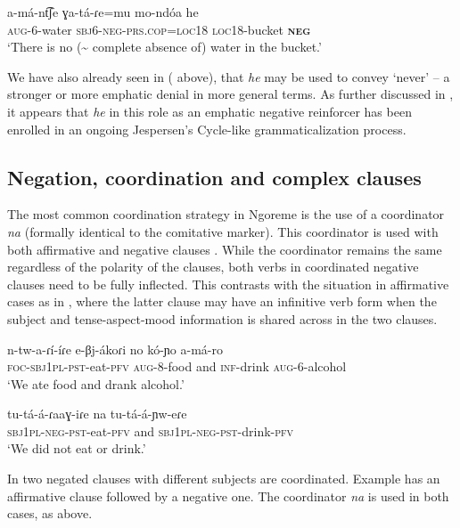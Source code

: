 \documentclass[output=paper,colorlinks,citecolor=brown,draftmode]{langscibook}
\begin{document}
\ea\label{ex:ngo:81} 
    \gll a{}-má{}-nt͡ʃe ɣa-tá{}-ɾe=mu mo-ndóa he\\ 
        \textsc{aug-}6-water \textsc{sbj6-neg-}\textsc{prs.cop=loc18} \textsc{loc18}{}-bucket \textbf{\textsc{neg}}\\
    \glt‘There is no ({\textasciitilde} complete absence of) water in the bucket.’ 
\z 

We have also already seen in  ( above), that \textit{he} may be used to convey ‘never’ – a stronger or more emphatic denial in more general terms. As further discussed in 
, it appears that \textit{he} in this role as an emphatic negative reinforcer has been enrolled in an ongoing Jespersen’s Cycle-like grammaticalization process. 

\subsection{Negation, coordination and complex clauses}\label{sec:ngo:4.5}

The most common coordination strategy in Ngoreme is the use of a coordinator \textit{na} (formally identical to the comitative marker). This coordinator is used with both affirmative  and negative clauses . While the coordinator remains the same regardless of the polarity of the clauses, both verbs in coordinated negative clauses need to be fully inflected. This contrasts with the situation in affirmative cases as in , where the latter clause may have an infinitive verb form when the subject and tense-aspect-mood information is shared across in the two clauses.

\ea\label{ex:ngo:82} 
    \gll n{}-tw{}-a{}-ɾí{}-íɾe e{}-βj-ákoɾi no kó{}-ɲo a{}-má{}-ro\\ 
        \textsc{foc-sbj1pl-pst}{}-eat-\textsc{pfv} \textsc{aug-}8-food and \textsc{inf}{}-drink \textsc{aug-}6-alcohol \\
     \glt ‘We ate food and drank alcohol.’
\z 

\ea\label{ex:ngo:83} 
    \gll tu{}-tá{}-á{}-ɾaaɣ{}-iɾe na tu{}-tá{}-á{}-ɲw{}-eɾe\\ 
        \textsc{sbj1pl{}-neg-pst}{}-eat-\textsc{pfv} and \textsc{sbj1pl-neg-pst}{}-drink-\textsc{pfv}\\
    \glt ‘We did not eat or drink.’
\z 

In  two negated clauses with different subjects are coordinated. Example  has an affirmative clause followed by a negative one. The coordinator \textit{na} is used in both cases, as above.
\end{document}
